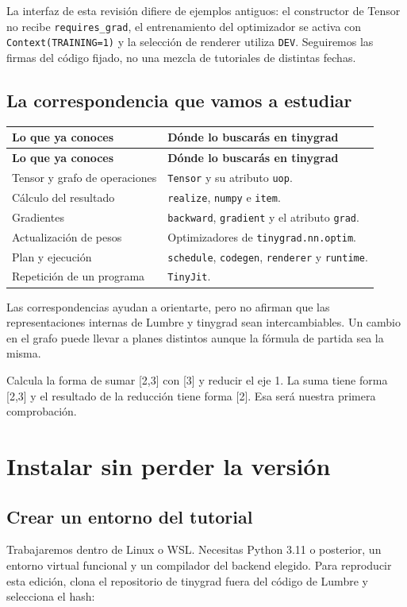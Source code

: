 \documentclass[12pt,a4paper,oneside]{report}
\begin{document}
La interfaz de esta revisión difiere de ejemplos antiguos: el constructor de Tensor no recibe \texttt{requires\_grad}, el entrenamiento del optimizador se activa con \texttt{Context(TRAINING=1)} y la selección de renderer utiliza \texttt{DEV}. Seguiremos las firmas del código fijado, no una mezcla de tutoriales de distintas fechas. \cite{tiny-tensor,tiny-optim,tiny-device}

\section{La correspondencia que vamos a estudiar}
{\small
\begin{longtable}{@{}P{0.3\textwidth}P{0.65\textwidth}@{}}
\toprule
\textbf{Lo que ya conoces} & \textbf{Dónde lo buscarás en tinygrad}\\
\midrule
\endfirsthead
\toprule
\textbf{Lo que ya conoces} & \textbf{Dónde lo buscarás en tinygrad}\\
\midrule
\endhead
Tensor y grafo de operaciones & \texttt{Tensor} y su atributo \texttt{uop}.\\
Cálculo del resultado & \texttt{realize}, \texttt{numpy} e \texttt{item}.\\
Gradientes & \texttt{backward}, \texttt{gradient} y el atributo \texttt{grad}.\\
Actualización de pesos & Optimizadores de \texttt{tinygrad.nn.optim}.\\
Plan y ejecución & \texttt{schedule}, \texttt{codegen}, \texttt{renderer} y \texttt{runtime}.\\
Repetición de un programa & \texttt{TinyJit}.\\
\bottomrule
\end{longtable}
}
Las correspondencias ayudan a orientarte, pero no afirman que las representaciones internas de Lumbre y tinygrad sean intercambiables. Un cambio en el grafo puede llevar a planes distintos aunque la fórmula de partida sea la misma.

\begin{comprueba}
Calcula la forma de sumar [2,3] con [3] y reducir el eje 1. La suma tiene forma [2,3] y el resultado de la reducción tiene forma [2]. Esa será nuestra primera comprobación.

\end{comprueba}
\chapter{Instalar sin perder la versión}
\section{Crear un entorno del tutorial}
Trabajaremos dentro de Linux o WSL. Necesitas Python 3.11 o posterior, un entorno virtual funcional y un compilador del backend elegido. Para reproducir esta edición, clona el repositorio de tinygrad fuera del código de Lumbre y selecciona el hash:
\end{document}
